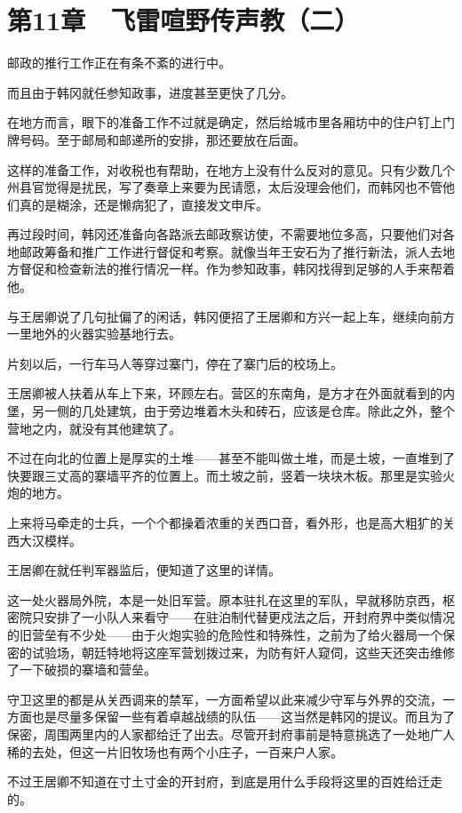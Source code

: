 \section{第11章　飞雷喧野传声教（二）}

邮政的推行工作正在有条不紊的进行中。

而且由于韩冈就任参知政事，进度甚至更快了几分。

在地方而言，眼下的准备工作不过就是确定，然后给城市里各厢坊中的住户钉上门牌号码。至于邮局和邮递所的安排，那还要放在后面。

这样的准备工作，对收税也有帮助，在地方上没有什么反对的意见。只有少数几个州县官觉得是扰民，写了奏章上来要为民请愿，太后没理会他们，而韩冈也不管他们真的是糊涂，还是懒病犯了，直接发文申斥。

再过段时间，韩冈还准备向各路派去邮政察访使，不需要地位多高，只要他们对各地邮政筹备和推广工作进行督促和考察。就像当年王安石为了推行新法，派人去地方督促和检查新法的推行情况一样。作为参知政事，韩冈找得到足够的人手来帮着他。

与王居卿说了几句扯偏了的闲话，韩冈便招了王居卿和方兴一起上车，继续向前方一里地外的火器实验基地行去。

片刻以后，一行车马人等穿过寨门，停在了寨门后的校场上。

王居卿被人扶着从车上下来，环顾左右。营区的东南角，是方才在外面就看到的内堡，另一侧的几处建筑，由于旁边堆着木头和砖石，应该是仓库。除此之外，整个营地之内，就没有其他建筑了。

不过在向北的位置上是厚实的土堆——甚至不能叫做土堆，而是土坡，一直堆到了快要跟三丈高的寨墙平齐的位置上。而土坡之前，竖着一块块木板。那里是实验火炮的地方。

上来将马牵走的士兵，一个个都操着浓重的关西口音，看外形，也是高大粗犷的关西大汉模样。

王居卿在就任判军器监后，便知道了这里的详情。

这一处火器局外院，本是一处旧军营。原本驻扎在这里的军队，早就移防京西，枢密院只安排了一小队人来看守——在驻泊制代替更戍法之后，开封府界中类似情况的旧营垒有不少处——由于火炮实验的危险性和特殊性，之前为了给火器局一个保密的试验场，朝廷特地将这座军营划拨过来，为防有奸人窥伺，这些天还突击维修了一下破损的寨墙和营垒。

守卫这里的都是从关西调来的禁军，一方面希望以此来减少守军与外界的交流，一方面也是尽量多保留一些有着卓越战绩的队伍——这当然是韩冈的提议。而且为了保密，周围两里内的人家都给迁了出去。尽管开封府事前是特意挑选了一处地广人稀的去处，但这一片旧牧场也有两个小庄子，一百来户人家。

不过王居卿不知道在寸土寸金的开封府，到底是用什么手段将这里的百姓给迁走的。


